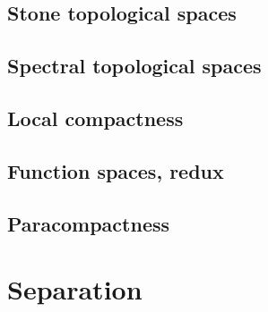 \documentclass[a4paper,nobib,nols]{tufte-book}
\begin{document}
\section{Stone topological spaces}%
\label{sec:stone_topological_spaces}

\section{Spectral topological spaces}%
\label{sec:spectral_topological_spaces}

\section{Local compactness}%
\label{sec:local_compactness}

\section{Function spaces, redux}%
\label{sec:function_spaces_redux}

\section{Paracompactness}%
\label{sec:paracompactness}

\chapter{Separation}%
\label{cha:separation}

\end{document}
